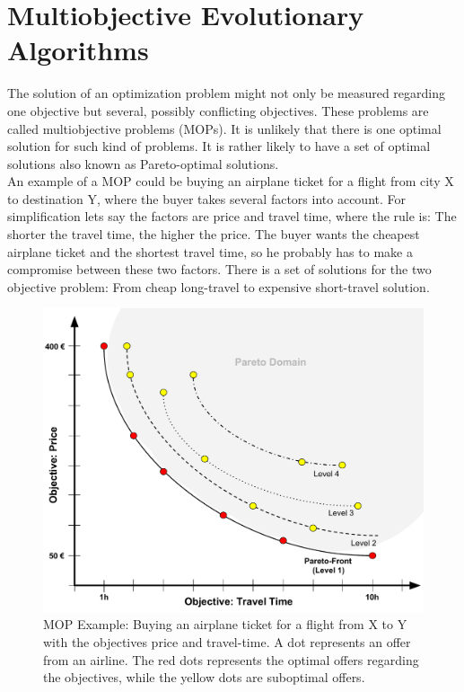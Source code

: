     \section{Multiobjective Evolutionary Algorithms}
    The solution of an optimization problem might not only be measured regarding one objective but several, possibly conflicting objectives. These problems are called multiobjective problems (MOPs). It is unlikely that there is one optimal solution for such kind of problems. It is rather likely to have a set of optimal solutions also known as Pareto-optimal solutions.\\
    An example of a MOP could be buying an airplane ticket for a flight from city X to destination Y, where the buyer takes several factors into account. For simplification lets say the factors are price and travel time, where the rule is: The shorter the travel time, the higher the price. The buyer wants the cheapest airplane ticket and the shortest travel time, so he probably has to make a compromise between these two factors. There is a set of solutions for the two objective problem: From cheap long-travel to expensive short-travel solution.
    \begin{figure}
        \centering
        \includegraphics[scale=0.3]{./Figures/ParetoExample2}
        \caption{MOP Example: Buying an airplane ticket for a flight from X to Y with the objectives price and travel-time. A dot represents an offer from an airline. The red dots represents the optimal offers regarding the objectives, while the yellow dots are suboptimal offers.}
        \label{fig:paretoExample}
    \end{figure}
